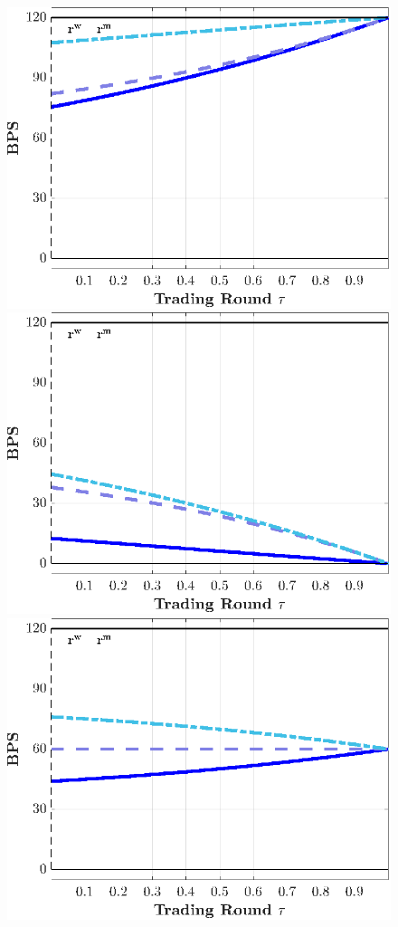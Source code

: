 \documentclass[12pt,american,english,notitlepage]{article}
\begin{document}
\begin{figure}[htb]
\begin{center}
 \endminipage
\par\end{center}

\vspace{6pt}

\centering{}
 \\[2pt]\includegraphics[width=0.8\linewidth]{NewCode/Figures/F_l_Chiminus_tau.eps}
\endminipage{}
 \\[2pt]
\includegraphics[width=0.8\linewidth]{NewCode/Figures/F_l_Chiplus_tau.eps}
\endminipage{}
 \\[2pt]
\includegraphics[width=0.8\linewidth]{NewCode/Figures/F_l_InterbankRate_tau.eps}\endminipage

\end{figure}
\end{document}
